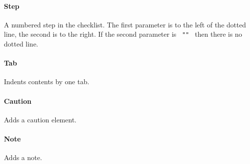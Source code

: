 \paragraph{Step}\label{step}

A numbered step in the checklist. The first parameter is to the left of
the dotted line, the second is to the right. If the second parameter is
\texttt{\ ""\ } then there is no dotted line.

\begin{Shaded}
\begin{Highlighting}[]
\end{Highlighting}
\end{Shaded}

\paragraph{Tab}\label{tab}

Indents contents by one tab.

\begin{Shaded}
\begin{Highlighting}[]
\end{Highlighting}
\end{Shaded}

\paragraph{Caution}\label{caution}

Adds a caution element.

\begin{Shaded}
\begin{Highlighting}[]
\end{Highlighting}
\end{Shaded}

\paragraph{Note}\label{note}

Adds a note.

\begin{Shaded}
\begin{Highlighting}[]
\end{Highlighting}
\end{Shaded}

